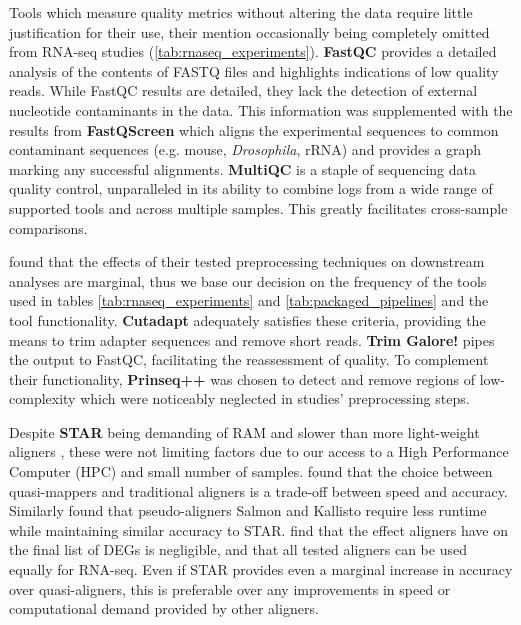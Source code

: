 Tools which measure quality metrics without altering the data require little justification for their use, their mention occasionally being completely omitted from RNA-seq studies (\autoref{tab:rnaseq_experiments}). \textbf{FastQC} provides a detailed analysis of the contents of FASTQ files and highlights indications of low quality reads. While FastQC results are detailed, they lack the detection of external nucleotide contaminants in the data. This information was supplemented with the results from \textbf{FastQScreen} which aligns the experimental sequences to common contaminant sequences (e.g. mouse, \textit{Drosophila}, rRNA) and provides a graph marking any successful alignments. \textbf{MultiQC} is a staple of sequencing data quality control, unparalleled in its ability to combine logs from a wide range of supported tools and across multiple samples. This greatly facilitates cross-sample comparisons.

\cite{he2020assessing} found that the effects of their tested preprocessing techniques on downstream analyses are marginal, thus we base our decision on the frequency of the tools used in tables \ref{tab:rnaseq_experiments} and \ref{tab:packaged_pipelines} and the tool functionality. \textbf{Cutadapt} adequately satisfies these criteria, providing the means to trim adapter sequences and remove short reads. \textbf{Trim Galore!} pipes the output to FastQC, facilitating the reassessment of quality. To complement their functionality, \textbf{Prinseq++} was chosen to detect and remove regions of low-complexity which were noticeably neglected in studies' preprocessing steps. 

Despite \textbf{STAR} being demanding of RAM \citep{Dobin2013} and slower than more light-weight aligners \citep{srivastava2020alignment}, these were not limiting factors due to our access to a High Performance Computer (HPC) and small number of samples. \cite{srivastava2020alignment} found that the choice between quasi-mappers and traditional aligners is a trade-off between speed and accuracy. Similarly \cite{Zhang2017} found that pseudo-aligners Salmon and Kallisto require less runtime while maintaining similar accuracy to STAR. \cite{Schaarschmidt2020} find that the effect aligners have on the final list of \ac{DEG}s is negligible, and that all tested aligners can be used equally for RNA-seq. Even if STAR provides even a marginal increase in accuracy over quasi-aligners, this is preferable over any improvements in speed or computational demand provided by other aligners.


